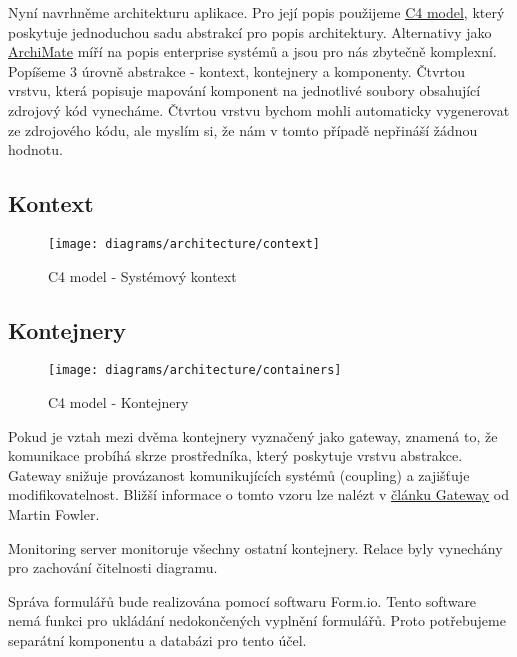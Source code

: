 Nyní navrhněme architekturu aplikace.
Pro její popis použijeme \href{https://c4model.com/}{C4 model}, který poskytuje jednoduchou sadu abstrakcí pro popis architektury.
Alternativy jako \href{https://www.opengroup.org/archimate-forum}{ArchiMate} míří na popis enterprise systémů a jsou pro nás zbytečně komplexní.
Popíšeme 3 úrovně abstrakce - kontext, kontejnery a komponenty.
Čtvrtou vrstvu, která popisuje mapování komponent na jednotlivé soubory obsahující zdrojový kód vynecháme.
Čtvrtou vrstvu bychom mohli automaticky vygenerovat ze zdrojového kódu, ale myslím si, že nám v tomto případě nepřináší žádnou hodnotu.

\subsection{Kontext}\label{subsec:kontext}

\begin{figure}[H]
    \texttt{[image: diagrams/architecture/context]}
    \caption{C4 model - Systémový kontext}\label{fig:architecture-context}
\end{figure}

\subsection{Kontejnery}\label{subsec:kontejnery}

\begin{figure}[H]
    \texttt{[image: diagrams/architecture/containers]}
    \caption{C4 model - Kontejnery}\label{fig:architecture-containers}
\end{figure}

\begin{tcolorbox}
    Pokud je vztah mezi dvěma kontejnery vyznačený jako gateway, znamená to, že komunikace probíhá skrze prostředníka, který poskytuje vrstvu abstrakce.
    Gateway snižuje provázanost komunikujících systémů (coupling) a zajišťuje modifikovatelnost.
    Bližší informace o tomto vzoru lze nalézt v \href{https://martinfowler.com/articles/gateway-pattern.html}{článku Gateway} od Martin Fowler.
\end{tcolorbox}

\begin{tcolorbox}
    Monitoring server monitoruje všechny ostatní kontejnery.
    Relace byly vynechány pro zachování čitelnosti diagramu.
\end{tcolorbox}

Správa formulářů bude realizována pomocí softwaru Form.io.
Tento software nemá funkci pro ukládání nedokončených vyplnění formulářů.
Proto potřebujeme separátní komponentu a databázi pro tento účel.

